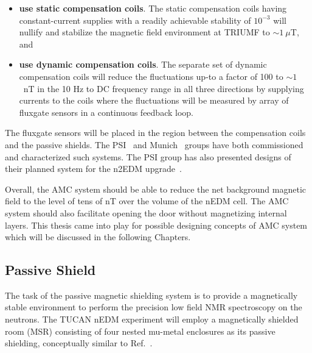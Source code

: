 \begin{itemize}
    \item {\bf use static compensation coils}. The static compensation coils having constant-current supplies with a readily achievable stability of $\mathrm{10^{-3}}$ will nullify and stabilize the magnetic field environment at TRIUMF to $\sim1~\mu$T, and 
     \item {\bf use dynamic compensation coils}. The separate set of dynamic compensation coils will reduce the fluctuations up-to a factor of 100 to $\sim1$~nT in the 10 Hz to DC frequency range in all three directions by supplying currents to the coils  where the fluctuations will be measured by array of fluxgate sensors in a continuous feedback loop. 
\end{itemize}



The fluxgate sensors will be placed in the region
between the compensation coils and the passive shields. The PSI~\cite{bea}
and Munich~\cite{lins} groups have both commissioned and characterized such systems. The PSI group has also presented designs of their planned system for the n2EDM upgrade~\cite{rawlik}.

Overall, the AMC system should be able to reduce the net background magnetic field to the level of tens of nT over the volume of the nEDM cell. The AMC system should also facilitate opening the door without magnetizing internal layers. This thesis came into play for possible designing concepts of AMC system which will be discussed in the following Chapters.

\subsection{Passive Shield}\label{sec:passive}
The task of the passive magnetic shielding system is to provide a magnetically stable environment to perform the precision low field NMR spectroscopy on the neutrons. The TUCAN nEDM experiment will employ a magnetically shielded room (MSR) consisting of four nested mu-metal enclosures as its passive shielding, conceptually similar to Ref.~\cite{msr_design}.  

